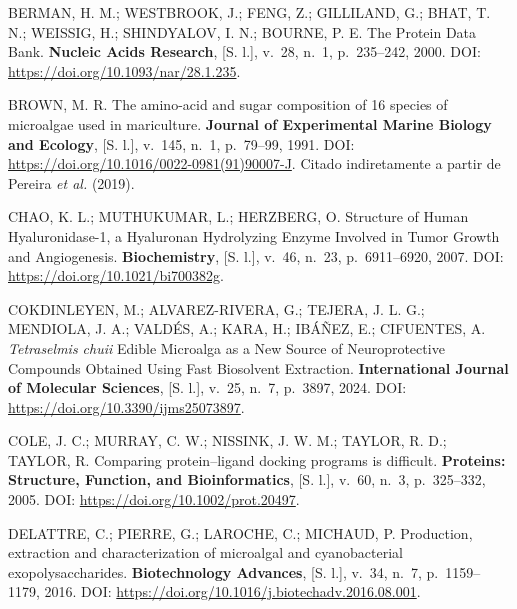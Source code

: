 \begin{samepage}
\filbreak\hypertarget{cite.0@berman2000pdb}{}BERMAN, H. M.; WESTBROOK, J.; FENG, Z.; GILLILAND, G.; BHAT, T. N.; WEISSIG, H.; SHINDYALOV, I. N.; BOURNE, P. E. The Protein Data Bank. \textbf{Nucleic Acids Research}, [S. l.], v.~28, n.~1, p.~235--242, 2000. DOI: \url{https://doi.org/10.1093/nar/28.1.235}.
\end{samepage}

\begin{samepage}
\filbreak\hypertarget{cite.0@brown1991}{}BROWN, M. R. The amino-acid and sugar composition of 16 species of microalgae used in mariculture. \textbf{Journal of Experimental Marine Biology and Ecology}, [S. l.], v.~145, n.~1, p.~79--99, 1991. DOI: \url{https://doi.org/10.1016/0022-0981(91)90007-J}. Citado indiretamente a partir de Pereira \textit{et al.} (2019).
\end{samepage}

\begin{samepage}
\filbreak\hypertarget{cite.0@chao2007}{}CHAO, K. L.; MUTHUKUMAR, L.; HERZBERG, O. Structure of Human Hyaluronidase-1, a Hyaluronan Hydrolyzing Enzyme Involved in Tumor Growth and Angiogenesis. \textbf{Biochemistry}, [S. l.], v.~46, n.~23, p.~6911--6920, 2007. DOI: \url{https://doi.org/10.1021/bi700382g}.
\end{samepage}

\begin{samepage}
\filbreak\hypertarget{cite.0@cokdinleyen2024}{}COKDINLEYEN, M.; ALVAREZ-RIVERA, G.; TEJERA, J. L. G.; MENDIOLA, J. A.; VALDÉS, A.; KARA, H.; IBÁÑEZ, E.; CIFUENTES, A. \textit{Tetraselmis chuii} Edible Microalga as a New Source of Neuroprotective Compounds Obtained Using Fast Biosolvent Extraction. \textbf{International Journal of Molecular Sciences}, [S. l.], v.~25, n.~7, p.~3897, 2024. DOI: \url{https://doi.org/10.3390/ijms25073897}.
\end{samepage}

\begin{samepage}
\filbreak\hypertarget{cite.0@cole2005}{}COLE, J. C.; MURRAY, C. W.; NISSINK, J. W. M.; TAYLOR, R. D.; TAYLOR, R. Comparing protein--ligand docking programs is difficult. \textbf{Proteins: Structure, Function, and Bioinformatics}, [S. l.], v.~60, n.~3, p.~325--332, 2005. DOI: \url{https://doi.org/10.1002/prot.20497}.
\end{samepage}

\begin{samepage}
\filbreak\hypertarget{cite.0@delattre2016}{}DELATTRE, C.; PIERRE, G.; LAROCHE, C.; MICHAUD, P. Production, extraction and characterization of microalgal and cyanobacterial exopolysaccharides. \textbf{Biotechnology Advances}, [S. l.], v.~34, n.~7, p.~1159--1179, 2016. DOI: \url{https://doi.org/10.1016/j.biotechadv.2016.08.001}.
\end{samepage}

